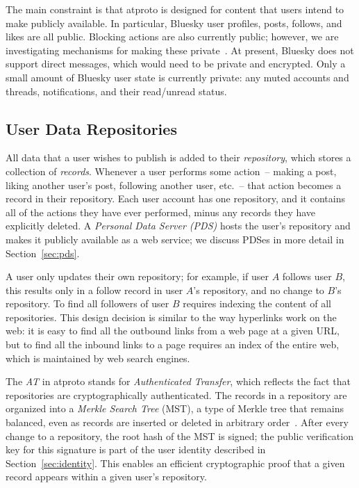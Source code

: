 \documentclass[sigconf,review]{acmart}
\begin{document}
The main constraint is that atproto is designed for content that users intend to make publicly available.
In particular, Bluesky user profiles, posts, follows, and likes are all public.
Blocking actions are also currently public; however, we are investigating mechanisms for making these private~\cite{PrivateBlocks}.
At present, Bluesky does not support direct messages, which would need to be private and encrypted.
Only a small amount of Bluesky user state is currently private: any muted accounts and threads, notifications, and their read/unread status.

\subsection{User Data Repositories}\label{sec:repos}

All data that a user wishes to publish is added to their \emph{repository}, which stores a collection of \emph{records}.
Whenever a user performs some action~-- making a post, liking another user's post, following another user, etc.~-- that action becomes a record in their repository.
Each user account has one repository, and it contains all of the actions they have ever performed, minus any records they have explicitly deleted.
A \emph{Personal Data Server (PDS)} hosts the user's repository and makes it publicly available as a web service; we discuss PDSes in more detail in Section~\ref{sec:pds}.

A user only updates their own repository; for example, if user $A$ follows user $B$, this results only in a follow record in user $A$'s repository, and no change to $B$'s repository.
To find all followers of user $B$ requires indexing the content of all repositories.
This design decision is similar to the way hyperlinks work on the web: it is easy to find all the outbound links from a web page at a given URL, but to find all the inbound links to a page requires an index of the entire web, which is maintained by web search engines.

The \emph{AT} in atproto stands for \emph{Authenticated Transfer}, which reflects the fact that repositories are cryptographically authenticated.
The records in a repository are organized into a \emph{Merkle Search Tree} (MST), a type of Merkle tree that remains balanced, even as records are inserted or deleted in arbitrary order~\cite{Auvolat:2019}.
After every change to a repository, the root hash of the MST is signed; the public verification key for this signature is part of the user identity described in Section~\ref{sec:identity}.
This enables an efficient cryptographic proof that a given record appears within a given user's repository.
\end{document}
